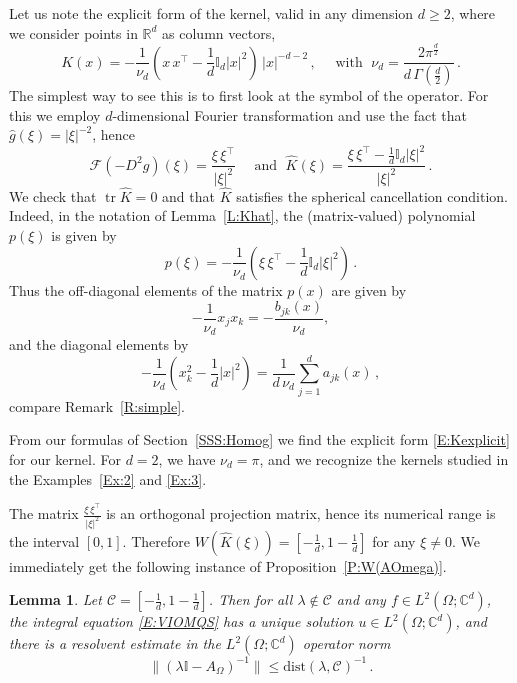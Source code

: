 \documentclass[12pt]{amsart}
\newtheorem{lemma}[theorem]{Lemma}
\theoremstyle{definition}
\theoremstyle{remark}
\numberwithin{equation}{section}
\newcommand\C{{\mathbb C}}
\newcommand\R{{\mathbb R}}
\newcommand{\sF}{{\mathscr F}}
\newcommand\cC{{\mathcal{C}}}
\newcommand {\Id}{\mathbb I}
\newcommand{\dist}{\mathrm{dist}}
\let\hat=\widehat
\begin{document}
Let us note the explicit form of the kernel, valid in any dimension $d\ge2$, where we consider points in $\R^{d}$ as column vectors,
\begin{equation}
\label{E:Kexplicit}
 K(x) = -\frac1{\nu_{d}} (x\,x^{\top}-\frac1d\Id_{d}|x|^{2})\,|x|^{-d-2}\,,
  \quad\mbox{ with }\;
  \nu_{d} = \frac{2\pi^{\frac d2}}{d\,\Gamma(\frac d2)}\,.\end{equation}
The simplest way to see this is to first look at the symbol of the operator. For this we employ $d$-dimensional Fourier transformation and use the fact that $\hat g(\xi)=|\xi|^{-2}$, hence
\begin{equation}
\label{E:SymMQS}
 \sF(-D^{2}g)(\xi) = \frac{\xi\,\xi^{\top}}{|\xi|^{2}} \quad\mbox{ and }\;
 \hat K(\xi) = \frac{\xi\,\xi^{\top}-\frac1d\Id_{d}|\xi|^{2}}{|\xi|^{2}}\,.
\end{equation}
We check that $\mathop{\mathrm{tr}}\hat K=0$ and that $\hat K$ satisfies the spherical cancellation condition. Indeed, in the notation of Lemma~\ref{L:Khat}, the (matrix-valued) polynomial $p(\xi)$ is given by
\begin{equation}
\label{E:pxiMQS}
  p(\xi)= -\frac1{\nu_{d}} (\xi\,\xi^{\top}-\frac1d\Id_{d}|\xi|^{2})\,.
\end{equation}
Thus the off-diagonal elements of the matrix $p(x)$ are given by
$$
  -\frac1{\nu_{d}}x_{j}x_{k} = -\frac{b_{jk}(x)}{\nu_{d}}, 
$$ 
and the diagonal elements by
$$
 -\frac1{\nu_{d}}(x_{k}^{2}-\frac1d|x|^{2})= \frac1{d\,\nu_{d}}\sum_{j=1}^{d}a_{jk}(x)\,,
$$
compare Remark~\ref{R:simple}.

From our formulas of Section~\ref{SSS:Homog} we find the explicit form \eqref{E:Kexplicit} for our kernel. For $d=2$, we have $\nu_{d}=\pi$, and we recognize the kernels studied in the Examples~\ref{Ex:2} and \ref{Ex:3}.

The matrix $\frac{\xi\,\xi^{\top}}{|\xi|^{2}}$ is an orthogonal projection matrix, hence its numerical range is the interval $[0,1]$. Therefore $W(\hat K(\xi))=[-\frac1d,1-\frac1d]$ for any $\xi\ne0$. We immediately get the following instance of Proposition~\ref{P:W(AOmega)}.
\begin{lemma}
 \label{L:WAMQS}
 Let $\cC=[-\frac1d,1-\frac1d]$. Then for all $\lambda\not\in\cC$ and any $f\in L^{2}(\Omega;\C^{d})$, the integral equation \eqref{E:VIOMQS} has a unique solution $u\in L^{2}(\Omega;\C^{d})$, and there is a resolvent estimate in the $L^{2}(\Omega;\C^{d})$ operator norm
\begin{equation}
\label{E:resAOmegaMQS}
 \|(\lambda\Id-A_{\Omega})^{-1}\| \le \dist(\lambda,\cC)^{-1}\,.
\end{equation} 
\end{lemma}
\end{document}
